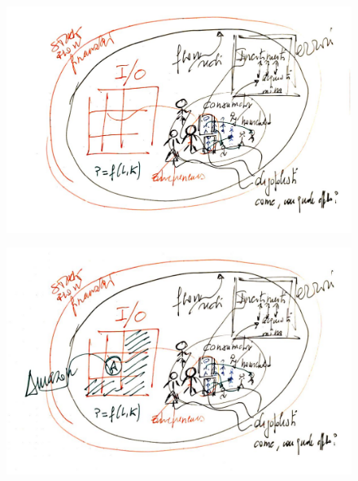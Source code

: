 \documentclass[]{beamer}
\begin{document}
\begin{frame}{5}



\begin{figure}[H]
\center
\includegraphics[scale=0.55]{5.pdf}
\end{figure}

\end{frame}

\begin{frame}{6}



\begin{figure}[H]
\center
\includegraphics[scale=0.55]{6.pdf}
\end{figure}

\end{frame}
\end{document}
